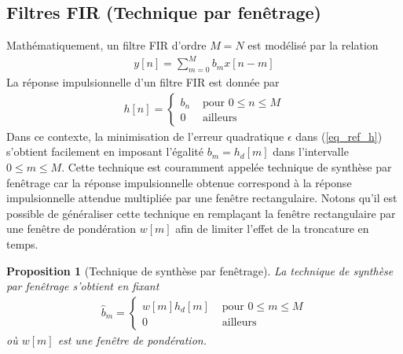 \documentclass[11pt,a4paper]{IEEEtran}
\newtheorem{proposition}{Proposition}
\begin{document}
\subsection{Filtres FIR (Technique par fenêtrage)}

Mathématiquement, un filtre FIR d'ordre $M=N$ est modélisé par la relation
\begin{align}
y[n]=\sum_{m=0}^{M} b_m x[n-m]
\end{align}
La réponse impulsionnelle d'un filtre FIR est donnée par
\begin{align}
h[n]=\left\{\begin{array}{cl}b_n&\textrm{ pour }0\le n \le M\\
0& \textrm{ ailleurs}
\end{array}\right.
\end{align}
Dans ce contexte, la minimisation de l'erreur quadratique $\epsilon$ dans (\ref{eq_ref_h}) s'obtient facilement en imposant l'égalité $b_m=h_d[m]$ dans l'intervalle $0\le m \le M$. Cette technique est couramment appelée technique de synthèse par fenêtrage car la réponse impulsionnelle obtenue correspond à la réponse impulsionnelle attendue multipliée par une fenêtre rectangulaire. Notons qu'il est possible de généraliser cette technique en remplaçant la fenêtre rectangulaire par une fenêtre de pondération $w[m]$ afin de limiter l'effet de la troncature en temps.
\begin{proposition}[Technique de synthèse par fenêtrage]
La technique de synthèse par fenêtrage s'obtient en fixant 
\begin{align}
\widehat{b}_m=\left\{\begin{array}{cl}w[m]h_d[m]&\textrm{ pour }0\le m \le M\\
0& \textrm{ ailleurs}
\end{array}\right.
\end{align}
où $w[m]$ est une fenêtre de pondération.
\end{proposition}
\end{document}
